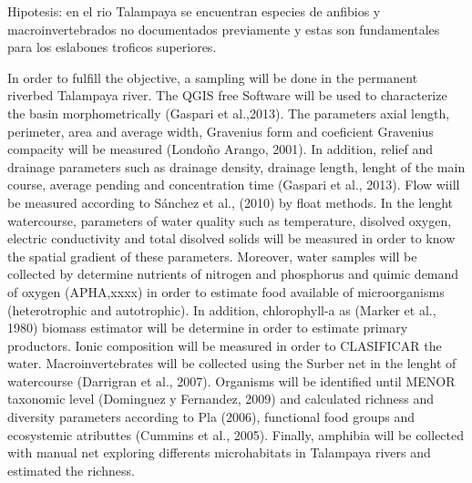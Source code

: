 \documentclass[11pt,a4paper,oneside]{article}
\begin{document}
Hipotesis: en el rio Talampaya se encuentran especies de anfibios y macroinvertebrados no documentados previamente y estas son fundamentales para los eslabones troficos superiores. 

In order to fulfill the objective, a sampling will be done in the permanent riverbed Talampaya river. The QGIS free Software will be used to characterize the basin morphometrically (Gaspari et al.,2013). The parameters axial length, perimeter, area and average width, Gravenius form and coeficient Gravenius compacity will be measured (Londoño Arango, 2001). In addition, relief and drainage parameters such as drainage density, drainage length, lenght of the main course, average pending and concentration time (Gaspari et al., 2013). Flow wiill be measured according to Sánchez et al., (2010) by float methods. In the lenght watercourse, parameters of water quality such as temperature, disolved oxygen, electric conductivity and total disolved solids will be measured in order to know the spatial gradient of these parameters. Moreover, water samples will be collected by determine nutrients of nitrogen and phosphorus and quimic demand of oxygen (APHA,xxxx) in order to estimate food available of microorganisms (heterotrophic and autotrophic). In addition, chlorophyll-a as (Marker et al., 1980) biomass estimator will be determine in order to estimate primary productors. Ionic composition will be measured in order to CLASIFICAR the water. 
Macroinvertebrates will be collected using the Surber net in the lenght of watercourse (Darrigran et al., 2007). Organisms will be identified until MENOR taxonomic level (Dominguez y Fernandez, 2009) and calculated richness and diversity parameters according to Pla (2006), functional food groups and ecosystemic atributtes (Cummins et al., 2005). Finally, amphibia will be collected with manual net exploring differents microhabitats in Talampaya rivers and estimated the richness.

\end{document}
